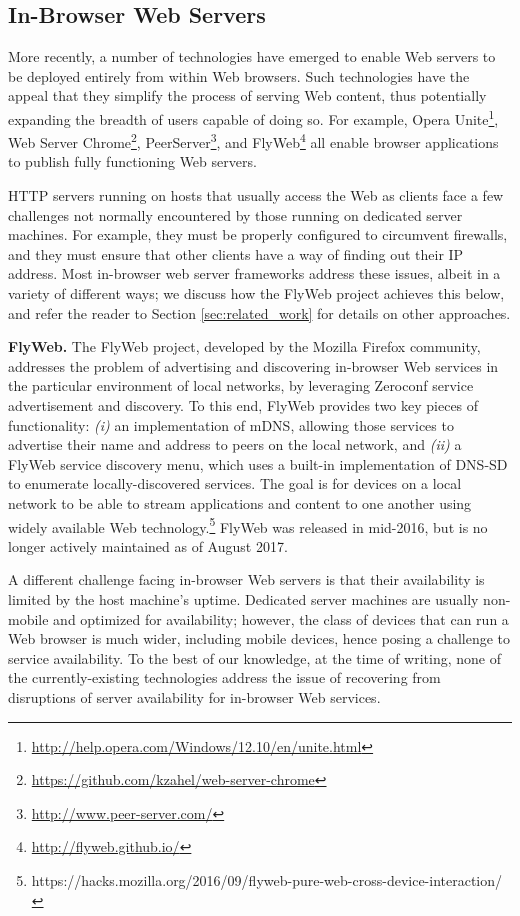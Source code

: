 \subsection{In-Browser Web Servers}
\label{sub:background_in_browser_web_servers}

More recently, a number of technologies have emerged to enable Web servers to be deployed entirely from within Web browsers.
Such technologies have the appeal that they simplify the process of serving Web content, thus potentially expanding the breadth of users capable of doing so.
For example, Opera Unite\footnote{\url{http://help.opera.com/Windows/12.10/en/unite.html}}, Web Server Chrome\footnote{\url{https://github.com/kzahel/web-server-chrome}}, PeerServer\footnote{\url{http://www.peer-server.com/}}, and FlyWeb\footnote{\url{http://flyweb.github.io/}} all enable browser applications to publish fully functioning Web servers.

HTTP servers running on hosts that usually access the Web as clients face a few challenges not normally encountered by those running on dedicated server machines.
For example, they must be properly configured to circumvent firewalls, and they must ensure that other clients have a way of finding out their IP address.
Most in-browser web server frameworks address these issues, albeit in a variety of different ways; we discuss how the FlyWeb project achieves this below, and refer the reader to Section \ref{sec:related_work} for details on other approaches.

\textbf{FlyWeb.}
The FlyWeb project, developed by the Mozilla Firefox community, addresses the problem of advertising and discovering in-browser Web services in the particular environment of local networks, by leveraging Zeroconf service advertisement and discovery.
To this end, FlyWeb provides two key pieces of functionality: 
\textit{(i)} an implementation of mDNS, allowing those services to advertise their name and address to peers on the local network, and 
\textit{(ii)} a FlyWeb service discovery menu, which uses a built-in implementation of DNS-SD to enumerate locally-discovered services.
The goal is for devices on a local network to be able to stream applications and content to one another using widely available Web technology.\footnote{https://hacks.mozilla.org/2016/09/flyweb-pure-web-cross-device-interaction/}
FlyWeb was released in mid-2016, but is no longer actively maintained as of August 2017.

A different challenge facing in-browser Web servers is that their availability is limited by the host machine's uptime.
Dedicated server machines are usually non-mobile and optimized for availability; however, the class of devices that can run a Web browser is much wider, including mobile devices, hence posing a challenge to service availability.
To the best of our knowledge, at the time of writing, none of the currently-existing technologies address the issue of recovering from disruptions of server availability for in-browser Web services.

